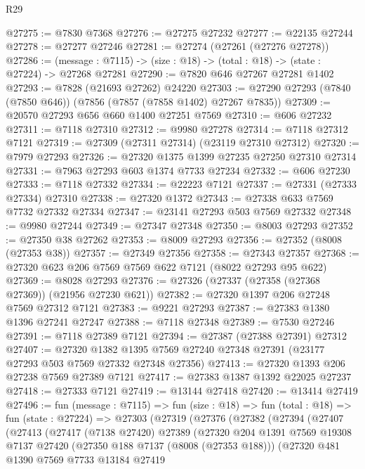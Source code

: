 \begin{lexlean}{R29}
\begin{coremodule}
@27275 := @7830 @7368
@27276 := @27275 @27232
@27277 := @22135 @27244
@27278 := @27277 @27246
@27281 := @27274 (@27261 (@27276 @27278))
@27286 := (message : @7115) -> (size : @18) -> (total : @18) -> (state : @27224) -> @27268 @27281
@27290 := @7820 @646 @27267 @27281 @1402
@27293 := @7828 (@21693 @27262) @24220
@27303 := @27290 @27293 (@7840 (@7850 @646)) (@7856 (@7857 (@7858 @1402) @27267 @7835))
@27309 := @20570 @27293 @656 @660 @1400 @27251 @7569
@27310 := @606 @27232
@27311 := @7118 @27310
@27312 := @9980 @27278
@27314 := @7118 @27312 @7121
@27319 := @27309 (@27311 @27314) (@23119 @27310 @27312)
@27320 := @7979 @27293
@27326 := @27320 @1375 @1399 @27235 @27250 @27310 @27314
@27331 := @7963 @27293 @603 @1374 @7733 @27234
@27332 := @606 @27230
@27333 := @7118 @27332
@27334 := @22223 @7121
@27337 := @27331 (@27333 @27334) @27310
@27338 := @27320 @1372
@27343 := @27338 @633 @7569 @7732 @27332 @27334
@27347 := @23141 @27293 @503 @7569 @27332
@27348 := @9980 @27244
@27349 := @27347 @27348
@27350 := @8003 @27293
@27352 := @27350 @38 @27262
@27353 := @8009 @27293
@27356 := @27352 (@8008 (@27353 @38))
@27357 := @27349 @27356
@27358 := @27343 @27357
@27368 := @27320 @623 @206 @7569 @7569 @622 @7121 (@8022 @27293 @95 @622)
@27369 := @8028 @27293
@27376 := @27326 (@27337 (@27358 (@27368 @27369)) (@21956 @27230 @621))
@27382 := @27320 @1397 @206 @27248 @7569 @27312 @7121
@27383 := @9221 @27293
@27387 := @27383 @1380 @1396 @27241 @27247
@27388 := @7118 @27348
@27389 := @7530 @27246
@27391 := @7118 @27389 @7121
@27394 := @27387 (@27388 @27391) @27312
@27407 := @27320
    @1382
    @1395
    @7569
    @27240
    @27348
    @27391
    (@23177 @27293 @503 @7569 @27332 @27348 @27356)
@27413 := @27320 @1393 @206 @27238 @7569 @27389 @7121
@27417 := @27383 @1387 @1392 @22025 @27237
@27418 := @27333 @7121
@27419 := @13144 @27418
@27420 := @13414 @27419
@27496 := fun (message : @7115) =>
  fun (size : @18) =>
  fun (total : @18) =>
  fun (state : @27224) =>
  @27303
    (@27319
      (@27376
        (@27382
          (@27394
            (@27407
              (@27413
                (@27417
                  (@7138 @27420)
                  @27389
                  (@27320
                    @204
                    @1391
                    @7569
                    @19308
                    @7137
                    @27420
                    (@27350 @188 @7137 (@8008 (@27353 @188)))
                    (@27320
                      @481
                      @1390
                      @7569
                      @7733
                      @13184
                      @27419

\end{coremodule}
\end{lexlean}
